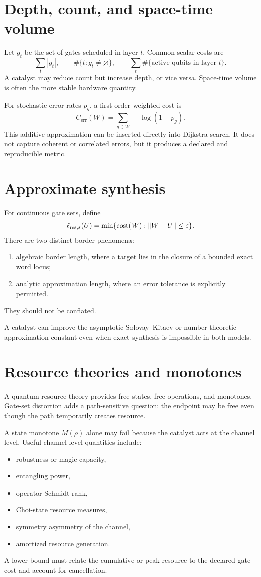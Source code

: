 \section{Depth, count, and space-time volume}
Let $g_t$ be the set of gates scheduled in layer $t$.  Common scalar costs are
\[
\sum_t |g_t|,
\qquad
\#\{t:g_t\ne\varnothing\},
\qquad
\sum_t \#\{\text{active qubits in layer }t\}.
\]
A catalyst may reduce count but increase depth, or vice versa.  Space-time volume is often the more stable hardware quantity.

For stochastic error rates $p_g$, a first-order weighted cost is
\[
C_{\mathrm{err}}(W)=\sum_{g\in W}-\log(1-p_g).
\]
This additive approximation can be inserted directly into Dijkstra search.  It does not capture coherent or correlated errors, but it produces a declared and reproducible metric.

\section{Approximate synthesis}
For continuous gate sets, define
\[
\ell_{\mathrm{res},\varepsilon}(U)
=
\min\{\operatorname{cost}(W):\|W-U\|\le\varepsilon\}.
\]
There are two distinct border phenomena:
\begin{enumerate}
\item algebraic border length, where a target lies in the closure of a bounded exact word locus;
\item analytic approximation length, where an error tolerance is explicitly permitted.
\end{enumerate}
They should not be conflated.

A catalyst can improve the asymptotic Solovay--Kitaev or number-theoretic approximation constant even when exact synthesis is impossible in both models.

\section{Resource theories and monotones}
A quantum resource theory provides free states, free operations, and monotones.  Gate-set distortion adds a path-sensitive question: the endpoint may be free even though the path temporarily creates resource.

A state monotone $M(\rho)$ alone may fail because the catalyst acts at the channel level.  Useful channel-level quantities include:
\begin{itemize}
\item robustness or magic capacity,
\item entangling power,
\item operator Schmidt rank,
\item Choi-state resource measures,
\item symmetry asymmetry of the channel,
\item amortized resource generation.
\end{itemize}
A lower bound must relate the cumulative or peak resource to the declared gate cost and account for cancellation.

